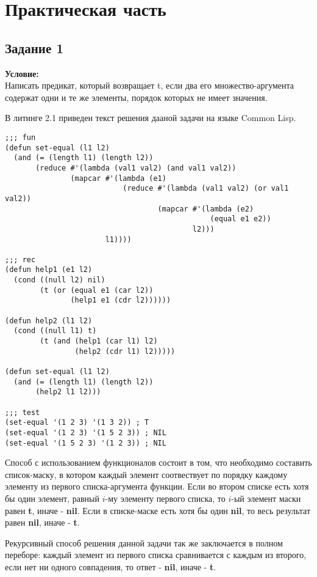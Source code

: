 \chapter{Практическая часть}

\lstset{language=lisp}

\section{Задание \No{}1}
\textbf{Условие:}\\Написать предикат, который возвращает t, если два его множество-аргумента содержат одни и те же элементы, порядок которых не имеет значения.

В литинге 2.1 приведен текст решения дааной задачи на языке Common Lisp.

\begin{lstlisting}[caption={Задание \No{}1}]
;;; fun
(defun set-equal (l1 l2)
  (and (= (length l1) (length l2))
       (reduce #'(lambda (val1 val2) (and val1 val2))
               (mapcar #'(lambda (e1)
                           (reduce #'(lambda (val1 val2) (or val1 val2))
                                   (mapcar #'(lambda (e2)
                                               (equal e1 e2))
                                           l2)))
                       l1))))

;;; rec
(defun help1 (e1 l2)
  (cond ((null l2) nil)
        (t (or (equal e1 (car l2))
               (help1 e1 (cdr l2))))))

(defun help2 (l1 l2)
  (cond ((null l1) t)
        (t (and (help1 (car l1) l2)
                (help2 (cdr l1) l2)))))

(defun set-equal (l1 l2)
  (and (= (length l1) (length l2))
       (help2 l1 l2)))

;;; test
(set-equal '(1 2 3) '(1 3 2)) ; T
(set-equal '(1 2 3) '(1 5 2 3)) ; NIL
(set-equal '(1 5 2 3) '(1 2 3)) ; NIL
\end{lstlisting}

Способ с использованием функционалов состоит в том, что необходимо составить список-маску, в котором каждый элемент соотвествует по порядку каждому элементу из первого списка-аргумента функции. Если во втором списке есть хотя бы один элемент, равный $i$-му элементу первого списка, то $i$-ый элемент маски равен \textbf{t}, иначе - \textbf{nil}. Если в списке-маске есть хотя бы один \textbf{nil}, то весь результат равен \textbf{nil}, иначе -  \textbf{t}.

Рекурсивный способ решения данной задачи так же заключается в полном переборе: каждый элемент из первого списка сравнивается с каждым из второго, если нет ни одного совпадения, то ответ - \textbf{nil}, иначе - \textbf{t}.

